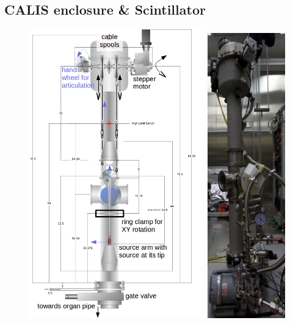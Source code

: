 \subsection{CALIS enclosure \& Scintillator}
\begin{figure}[htbp]
 \centering
 \includegraphics[width=0.68\textwidth]{Figures/CALISDimensions.png}
 \includegraphics[width=0.30\textwidth]{Figures/CALIS_overview_IMG_3763.jpg}

\end{figure}
